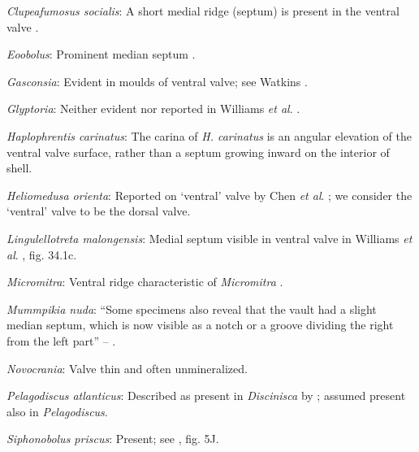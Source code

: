 \documentclass[openany]{book}
\theoremstyle{definition}
\theoremstyle{definition}
\theoremstyle{definition}
\theoremstyle{remark}
\begin{document}
\hypertarget{Clupeafumosus_socialis-coding-117}{}
\emph{Clupeafumosus socialis}: A short medial ridge (septum) is present
in the ventral valve \citep{Topper2013Reappraisalof}.

\hypertarget{Eoobolus-coding-117}{}
\emph{Eoobolus}: Prominent median septum \citep[fig. 4d, e
in][]{Balthasar2009Thebrachiopod}.

\hypertarget{Gasconsia-coding-117}{}
\emph{Gasconsia}: Evident in moulds of ventral valve; see Watkins
\citeyearpar{Watkins2002Newrecord}.

\hypertarget{Glyptoria-coding-117}{}
\emph{Glyptoria}: Neither evident nor reported in Williams \emph{et al}.
\citeyearpar{Williams2000LinguliformeaCraniiformea}.

\hypertarget{Haplophrentis_carinatus-coding-117}{}
\emph{Haplophrentis carinatus}: The carina of \emph{H. carinatus} is an
angular elevation of the ventral valve surface, rather than a septum
growing inward on the interior of shell.

\hypertarget{Heliomedusa_orienta-coding-117}{}
\emph{Heliomedusa orienta}: Reported on `ventral' valve by Chen \emph{et
al}. \citeyearpar{Chen2007Reinterpretationof}; we consider the `ventral'
valve to be the dorsal valve.

\hypertarget{Lingulellotreta_malongensis-coding-117}{}
\emph{Lingulellotreta malongensis}: Medial septum visible in ventral
valve in Williams \emph{et al}.
\citeyearpar{Williams2000LinguliformeaCraniiformea}, fig. 34.1c.

\hypertarget{Micromitra-coding-117}{}
\emph{Micromitra}: Ventral ridge characteristic of \emph{Micromitra}
\citep{Skovsted2010EarlyCambrian}.

\hypertarget{Mummpikia_nuda-coding-117}{}
\emph{Mummpikia nuda}: ``Some specimens also reveal that the vault had a
slight median septum, which is now visible as a notch or a groove
dividing the right from the left part'' --
\citet{Balthasar2008iMummpikia}.

\hypertarget{Novocrania-coding-117}{}
\emph{Novocrania}: Valve thin and often unmineralized.

\hypertarget{Pelagodiscus_atlanticus-coding-117}{}
\emph{Pelagodiscus atlanticus}: Described as present in
\emph{Discinisca} by \citet{Chen2007Reinterpretationof}; assumed present
also in \emph{Pelagodiscus}.

\hypertarget{Siphonobolus_priscus-coding-117}{}
\emph{Siphonobolus priscus}: Present; see
\citet{Popov2009Earlyontogeny}, fig. 5J.
\end{document}
